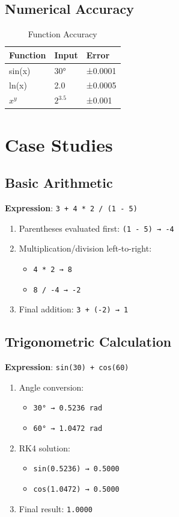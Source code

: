 \documentclass{article}
\begin{document}
\subsection{Numerical Accuracy}

\begin{table}[h]
\centering
\caption{Function Accuracy}
\begin{tabular}{|l|l|l|}
\hline
\textbf{Function} & \textbf{Input} & \textbf{Error} \\
\hline
sin(x) & 30° & ±0.0001 \\
ln(x) & 2.0 & ±0.0005 \\
$x^y$ & $2^3.5$ & ±0.001 \\
\hline
\end{tabular}
\end{table}

\section{Case Studies}
\subsection{Basic Arithmetic}

\textbf{Expression}: \texttt{3 + 4 * 2 / (1 - 5)}

\begin{enumerate}
\item Parentheses evaluated first: \texttt{(1 - 5) → -4}
\item Multiplication/division left-to-right:
  \begin{itemize}
  \item \texttt{4 * 2 → 8}
  \item \texttt{8 / -4 → -2}
  \end{itemize}
\item Final addition: \texttt{3 + (-2) → 1}
\end{enumerate}

\subsection{Trigonometric Calculation}

\textbf{Expression}: \texttt{sin(30) + cos(60)}

\begin{enumerate}
\item Angle conversion:
  \begin{itemize}
  \item \texttt{30° → 0.5236 rad}
  \item \texttt{60° → 1.0472 rad}
  \end{itemize}
\item RK4 solution:
  \begin{itemize}
  \item \texttt{sin(0.5236) → 0.5000}
  \item \texttt{cos(1.0472) → 0.5000}
  \end{itemize}
\item Final result: \texttt{1.0000}
\end{enumerate}
\end{document}
